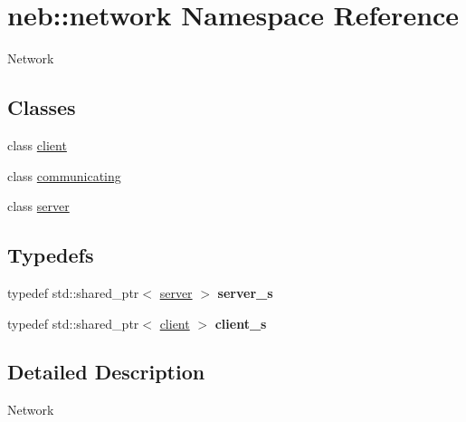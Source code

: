 \hypertarget{namespaceneb_1_1network}{\section{neb\-:\-:network \-Namespace \-Reference}
\label{namespaceneb_1_1network}
}


\-Network  


\subsection*{\-Classes}
\begin{DoxyCompactItemize}
\item 
class \hyperlink{classneb_1_1network_1_1client}{client}
\item 
class \hyperlink{classneb_1_1network_1_1communicating}{communicating}
\item 
class \hyperlink{classneb_1_1network_1_1server}{server}
\end{DoxyCompactItemize}
\subsection*{\-Typedefs}
\begin{DoxyCompactItemize}
\item 
\hypertarget{namespaceneb_1_1network_a452af21e9d59ab10e8c3b59eacd393df}{typedef std\-::shared\-\_\-ptr$<$ \hyperlink{classneb_1_1network_1_1server}{server} $>$ {\bfseries server\-\_\-s}}\label{namespaceneb_1_1network_a452af21e9d59ab10e8c3b59eacd393df}

\item 
\hypertarget{namespaceneb_1_1network_a91addb096a9291cf61369807bd3d3b34}{typedef std\-::shared\-\_\-ptr$<$ \hyperlink{classneb_1_1network_1_1client}{client} $>$ {\bfseries client\-\_\-s}}\label{namespaceneb_1_1network_a91addb096a9291cf61369807bd3d3b34}

\end{DoxyCompactItemize}


\subsection{\-Detailed \-Description}
\-Network 
